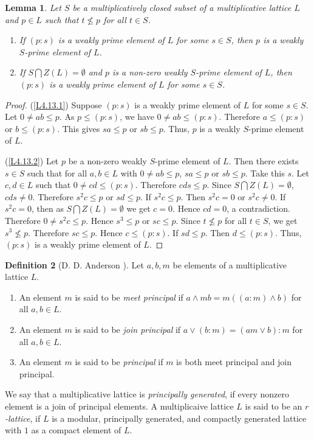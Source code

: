 \documentclass[10pt,twoside,a4paper]{amsart}
\numberwithin{equation}{section}
\theoremstyle{plain}
\newtheorem{lem}{Lemma}[section]
\theoremstyle{definition}
\newtheorem{defn}[lem]{Definition}
\begin{document}
\begin{lem}%
	Let $S$ be a multiplicatively closed subset of a multiplicative lattice $L$ and $p\in L$ such that $t\nleq p$ for all $t\in S$. 
	\begin{enumerate}
		\item\label{L4.13.1} If $(p:s)$ is a weakly prime element of $L$ for some $s\in S$, then $p$ is a weakly $S$-prime element of $L$.
		\item\label{L4.13.2} If $S\bigcap Z(L)=\emptyset$ and $p$ is a non-zero weakly $S$-prime element of $L$, then $(p:s)$ is a weakly prime element of $L$ for some $s\in S$.
	\end{enumerate}
\end{lem}
\begin{proof}
	(\ref{L4.13.1}) Suppose $(p:s)$ is a weakly prime element of $L$ for some $s\in S$. Let $ 0 \neq ab \leq p$. As $p \leq (p:s)$, we have  $0 \neq ab \leq (p:s)$. Therefore $a\leq (p:s)$ or $b\leq (p:s)$. This gives $sa\leq p$ or $sb\leq p$. Thus, $p$ is a weakly $S$-prime element of $L$.
	
	(\ref{L4.13.2}) Let $p$ be a non-zero weakly $S$-prime element of $L$. Then there exists $s\in S$ such that for all $a,b\in L$ with $0 \neq ab \leq p$, $sa\leq p$ or $sb\leq p$. Take this $s$. Let $ c, d \in L$ such that $ 0 \neq cd \leq (p:s)$. Therefore $cds\leq p$. Since $S\bigcap Z(L)=\emptyset$, $cds\neq 0$. Therefore $s^2c\leq p$ or $sd\leq p$. If $s^2c\leq p$. Then $s^2 c = 0$ or $s^2 c \neq 0$. If $s^2c=0$, then as $S\bigcap Z(L)=\emptyset$ we get $c=0$. Hence $cd=0$, a contradiction. Therefore $ 0 \neq s^2 c\leq p$. Hence $s^3\leq p$ or $sc\leq p$. Since $t\nleq p$ for all $t\in S$, we get  $s^3\nleq p$. Therefore $sc\leq p$. Hence $c\leq (p:s)$. If	$sd\leq p$. Then $d\leq (p:s)$.  Thus, $(p:s)$ is a weakly prime element of $L$.
\end{proof}

\begin{defn}[D. D. Anderson \cite{A}]
	Let $a, b, m$ be elements of a multiplicative lattice $L$. 
	\begin{enumerate}
		\item An element $m$ is said to be\textit{ meet principal} if $a \wedge mb = m((a:m) \wedge b)$ for all $a,b \in L$.
		\item An element $m$ is said to be \textit{join principal} if $a \vee (b :m) = (am \vee b): m$ for all $a,b \in L$.
		\item An element $m$ is said to be  \textit{principal} if $m$ is both meet principal and join principal.
	\end{enumerate}
	We say that a multiplicative lattice is \textit{principally generated}, if every nonzero element is a join of principal elements. A multiplicaive lattice $L$ is said to be an \textit{$r$-lattice}, if  $L$ is a modular, principally generated, and compactly generated lattice with $1$ as a compact element of $L$. 
\end{defn}
\end{document}

